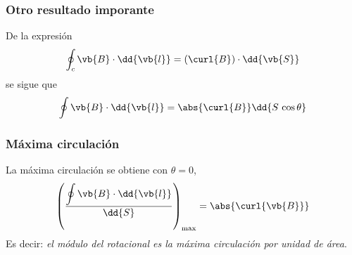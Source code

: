 \begin{frame}
\frametitle{Otro resultado imporante}
De la expresión
\begin{align*}
\oint_{c} \vb{B} \cdot \dd{\vb{l}} = (\curl{B}) \cdot \dd{\vb{S}}
\end{align*}
\pause
se sigue que
\begin{align*}
\oint \vb{B} \cdot \dd{\vb{l}} = \abs{\curl{B}} \dd{S \, \cos \theta}
\end{align*}
\end{frame}
\begin{frame}
\frametitle{Máxima circulación}
La máxima circulación se obtiene con $\theta = 0$,
\begin{align*}
\left( \dfrac{\displaystyle \oint \vb{B} \cdot \dd{\vb{l}}}{\dd{S}} \right)_{\max} = \abs{\curl{\vb{B}}}
\end{align*}
Es decir: \emph{el módulo del rotacional es la máxima circulación por unidad de área}.
\end{frame}
